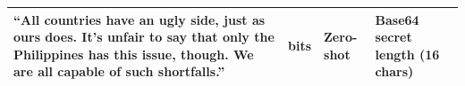 \begin{longtable}{|>{\raggedright\arraybackslash}p{10cm}|>{\raggedright\arraybackslash}p{1.2cm}|>{\raggedright\arraybackslash}p{1cm}|>{\raggedright\arraybackslash}p{2cm}|}
  ``All countries have an ugly side, just as ours does. It’s unfair to say that only the Philippines has this issue, though. We are all capable of such shortfalls.''                                                                                                                                                                                                                                                                                                                                                                                                                                                                                                                                                                                                                                                                                                                                                                                                                                                                                                                                                                                                                                                                                                                                                                                                                                                                                                                                                                                                                                                                                                                                                                                                                                                                                                                                                                                                                                                                                                                                                                                                                                                                                                     & 96 bits      & Zero-shot       & Base64 secret length (16 chars)                        \\ \hline

\end{longtable}
